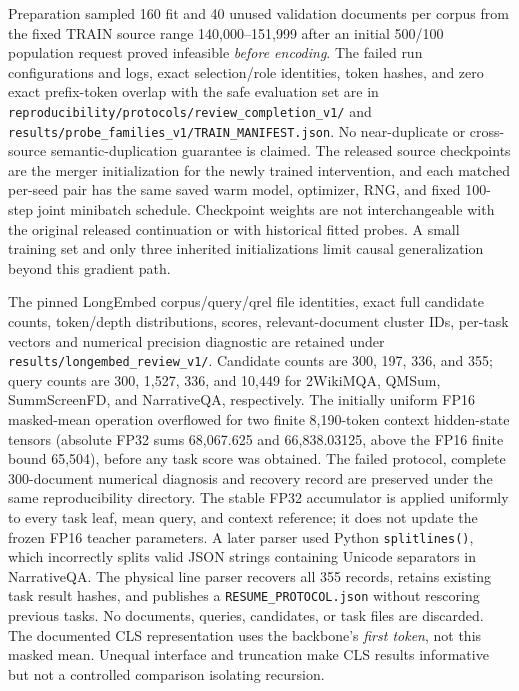 \documentclass[10pt]{article}
\begin{document}
Preparation sampled 160 fit and 40 unused validation documents per corpus
from the fixed TRAIN source range 140,000--151,999 after an initial 500/100 population
request proved infeasible \emph{before encoding}. The failed run configurations
and logs, exact selection/role identities, token hashes, and zero exact
prefix-token overlap with the safe evaluation set are in
\nolinkurl{reproducibility/protocols/review_completion_v1/} and
\nolinkurl{results/probe_families_v1/TRAIN_MANIFEST.json}. No near-duplicate
or cross-source semantic-duplication guarantee is claimed. The released
source checkpoints are the merger initialization for the newly trained
intervention, and each matched per-seed pair has the same saved warm model,
optimizer, RNG, and fixed 100-step joint minibatch schedule. Checkpoint weights
are not interchangeable with the original released continuation or with
historical fitted probes. A small training set and only three inherited
initializations limit causal generalization beyond this gradient path.

The pinned LongEmbed corpus/query/qrel file identities, exact full candidate
counts, token/depth distributions, scores, relevant-document cluster IDs,
per-task vectors and numerical precision diagnostic are retained under
\nolinkurl{results/longembed_review_v1/}.
Candidate counts are 300, 197, 336, and 355; query counts are 300, 1,527, 336,
and 10,449 for 2WikiMQA, QMSum, SummScreenFD, and NarrativeQA, respectively.
The initially uniform
FP16 masked-mean operation overflowed for two finite 8,190-token context
hidden-state tensors (absolute FP32 sums 68,067.625 and 66,838.03125,
above the FP16 finite bound 65,504), before any task score was obtained.
The failed protocol, complete 300-document numerical diagnosis and recovery
record are preserved under the same reproducibility directory. The stable
FP32 accumulator is applied uniformly to every task leaf, mean query, and
context reference; it does not update the frozen FP16 teacher parameters.
A later parser used Python \texttt{splitlines()}, which incorrectly splits
valid JSON strings containing Unicode separators in NarrativeQA. The physical
line parser recovers all 355 records, retains existing task result hashes,
and publishes a \texttt{RESUME\_PROTOCOL.json} without rescoring previous
tasks. No documents, queries, candidates, or task files are discarded.
The documented CLS representation uses the backbone's \emph{first token},
not this masked mean. Unequal interface and truncation make CLS results
informative but not a controlled comparison isolating recursion.
\end{document}
